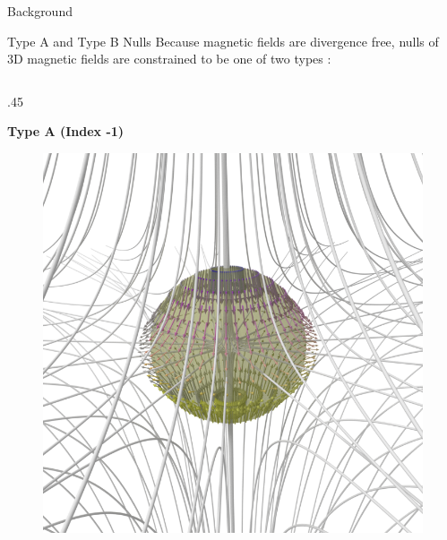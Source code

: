 \documentclass[final]{beamer}
\newlength{\onecolwid}
\begin{document}
\begin{frame}[t]
\begin{columns}[t]
\begin{column}{\onecolwid}
\begin{block}{\huge{Background}}
\begin{block}{Type A and Type B Nulls}
  Because magnetic fields are divergence free,
  nulls of 3D magnetic fields are constrained to be one of two types
  \cite{lau1990three, parnell1996structure, greene1988geometrical}:
  \begin{columns}[t,totalwidth=\onecolwid] %
    \begin{column}{.45\onecolwid}
        \begin{centering}
        \textbf{Type A (Index -1)}
        \begin{figure}
        \includegraphics[width=.45\onecolwid]{fig/negindex_start.png}
        \end{figure}
        \end{centering}
    \end{column}


\end{columns}
\end{block}
\end{block}
\end{column}
\end{columns}
\end{frame}
\end{document}
